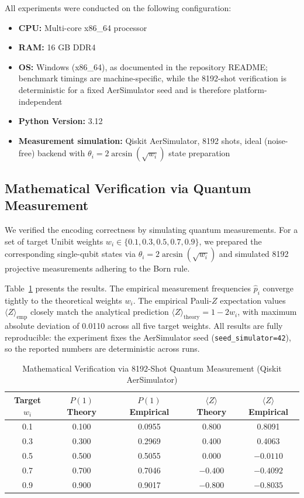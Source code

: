 ﻿\documentclass[12pt,a4paper]{article}
\begin{document}
All experiments were conducted on the following configuration:
\begin{itemize}
    \item \textbf{CPU:} Multi-core x86\_64 processor
    \item \textbf{RAM:} 16 GB DDR4
    \item \textbf{OS:} Windows (x86\_64), as documented in the repository README; benchmark timings are machine-specific, while the 8192-shot verification is deterministic for a fixed AerSimulator seed and is therefore platform-independent
    \item \textbf{Python Version:} 3.12
    \item \textbf{Measurement simulation:} Qiskit AerSimulator, 8192 shots, ideal (noise-free) backend with $\theta_i = 2\arcsin(\sqrt{w_i})$ state preparation
\end{itemize}

\subsection{Mathematical Verification via Quantum Measurement}

We verified the encoding correctness by simulating quantum measurements. For a set of target Unibit weights $w_i \in \{0.1, 0.3, 0.5, 0.7, 0.9\}$, we prepared the corresponding single-qubit states via $\theta_i = 2\arcsin(\sqrt{w_i})$ and simulated 8192 projective measurements adhering to the Born rule.

Table~\ref{tab:math_verify} presents the results. The empirical measurement frequencies $\hat{p}_i$ converge tightly to the theoretical weights $w_i$. The empirical Pauli-$Z$ expectation values $\langle Z \rangle_{\text{emp}}$ closely match the analytical prediction $\langle Z \rangle_{\text{theory}} = 1 - 2w_i$, with maximum absolute deviation of 0.0110 across all five target weights. All results are fully reproducible: the experiment fixes the AerSimulator seed (\texttt{seed\_simulator=42}), so the reported numbers are deterministic across runs.

\begin{table}[H]
\centering
\caption{Mathematical Verification via 8192-Shot Quantum Measurement (Qiskit AerSimulator)}
\label{tab:math_verify}
\small
\begin{tabular}{@{}ccccc@{}}
\toprule
\textbf{Target $w_i$} & \textbf{$P(1)$ Theory} & \textbf{$P(1)$ Empirical} & \textbf{$\langle Z \rangle$ Theory} & \textbf{$\langle Z \rangle$ Empirical} \\
\midrule
0.1 & 0.100 & 0.0955 & 0.800 & 0.8091 \\
0.3 & 0.300 & 0.2969 & 0.400 & 0.4063 \\
0.5 & 0.500 & 0.5055 & 0.000 & $-0.0110$ \\
0.7 & 0.700 & 0.7046 & $-0.400$ & $-0.4092$ \\
0.9 & 0.900 & 0.9017 & $-0.800$ & $-0.8035$ \\
\bottomrule
\end{tabular}
\end{table}
\end{document}
